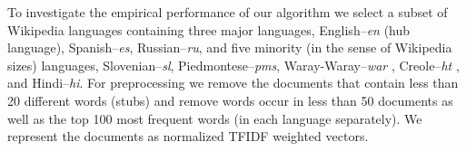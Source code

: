 \documentclass{article} %
\newcommand{\RR}{\mathbb{R}}
\begin{document}
To investigate the empirical performance of our algorithm %
we select a subset of Wikipedia languages containing three major languages, English--\emph{en} (hub language), Spanish--\emph{es}, Russian--\emph{ru}, and five minority (in the sense of Wikipedia sizes) languages, Slovenian--\emph{sl}, Piedmontese--\emph{pms}, Waray-Waray--\emph{war} %
, Creole--\emph{ht}%
, and Hindi--\emph{hi}.  %
For preprocessing we remove the documents that contain less than 20 different words (stubs) and remove words occur in less than 50 documents as well as the top 100 most frequent words (in each language separately). We represent the documents as normalized TFIDF\cite{Salton88term-weightingapproaches} weighted vectors.
\end{document}
